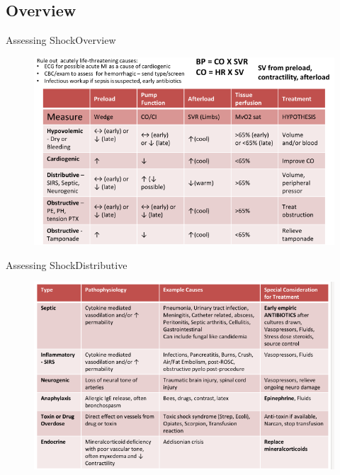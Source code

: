 \documentclass{beamer}
\begin{document}
		\subsection{Overview}
		\begin{frame}{Assessing Shock}{Overview}
			\begin{figure}
				\centering
				\includegraphics[height=0.8\textheight]{figures/shock-types}
				\label{fig:shock-types}
			\end{figure}
		\end{frame}
		\begin{frame}{Assessing Shock}{Distributive}
			\begin{figure}
				\centering
				\includegraphics[height=0.8\textheight]{figures/shock-distributive}
				\label{fig:shock-distributive}
			\end{figure}
		\end{frame}
\end{document}

